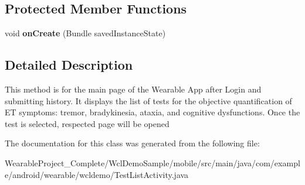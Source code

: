\subsection*{Protected Member Functions}
\begin{DoxyCompactItemize}
\item 
void {\bfseries on\+Create} (Bundle saved\+Instance\+State)\hypertarget{classcom_1_1example_1_1android_1_1wearable_1_1wcldemo_1_1TestListActivity_af6fb4f4e2083b823b482ee3ebf94444d}{}\label{classcom_1_1example_1_1android_1_1wearable_1_1wcldemo_1_1TestListActivity_af6fb4f4e2083b823b482ee3ebf94444d}

\end{DoxyCompactItemize}


\subsection{Detailed Description}
This method is for the main page of the Wearable App after Login and submitting history. It displays the list of tests for the objective quantification of ET symptoms\+: tremor, bradykinesia, ataxia, and cognitive dysfunctions. Once the test is selected, respected page will be opened 

The documentation for this class was generated from the following file\+:\begin{DoxyCompactItemize}
\item 
Wearable\+Project\+\_\+\+Complete/\+Wcl\+Demo\+Sample/mobile/src/main/java/com/example/android/wearable/wcldemo/Test\+List\+Activity.\+java\end{DoxyCompactItemize}
